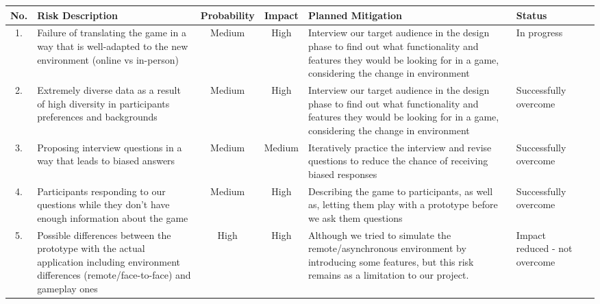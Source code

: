 \documentclass{sigchi}
\begin{document}
\renewcommand{\arraystretch}{1.5} %
\begin{table}[h!]
\centering
\begin{tabular}{ c | >{\raggedright}p{4cm} | c | c | >{\raggedright}p{5cm} | >{\raggedright\centering}p{2cm} l}
\textbf {No.} & 
\textbf{Risk Description} & 
\textbf{Probability} & 
\textbf{Impact} & 
\textbf{Planned Mitigation} & 
\textbf{Status} & \\ \hline \hline

1. &
Failure of translating the game in a way that is well-adapted to the new environment (online vs in-person) &
Medium &
High &
Interview our target audience in the design phase to find out what functionality and features they would be looking for in a game, considering the change in environment &
In progress & \\ \hline

2. &
Extremely diverse data as a result of high diversity in participants preferences and backgrounds &
Medium &
High &
Interview our target audience in the design phase to find out what functionality and features they would be looking for in a game, considering the change in environment &
Successfully overcome & \\ \hline

3. &
Proposing interview questions in a way that leads to biased answers &
Medium &
Medium &
Iteratively practice the interview and revise questions to reduce the chance of receiving biased responses &
Successfully overcome & \\ \hline


4. &
Participants responding to our questions while they don’t have enough information about the game &
Medium &
High &
Describing the game to participants, as well as, letting them play with a prototype before we ask them questions &
Successfully overcome & \\ \hline

5. &
Possible differences between the prototype with the actual application including environment differences (remote/face-to-face) and gameplay ones &
High & 
High &
Although we tried to simulate the remote/asynchronous environment by introducing some features, but this risk remains as a limitation to our project. &
Impact reduced - not overcome & \\ \hline


\end{tabular}
\end{table}
\end{document}
